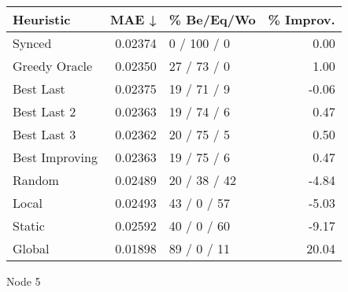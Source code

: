 \begin{tabular}{lrlr}
\toprule
\textbf{Heuristic} & \textbf{MAE ↓} & \textbf{\% Be/Eq/Wo} & \textbf{\% Improv.} \\
\midrule
            Synced &        0.02374 &          0 / 100 / 0 &                0.00 \\
     Greedy Oracle &        0.02350 &          27 / 73 / 0 &                1.00 \\
         Best Last &        0.02375 &          19 / 71 / 9 &               -0.06 \\
       Best Last 2 &        0.02363 &          19 / 74 / 6 &                0.47 \\
       Best Last 3 &        0.02362 &          20 / 75 / 5 &                0.50 \\
    Best Improving &        0.02363 &          19 / 75 / 6 &                0.47 \\
            Random &        0.02489 &         20 / 38 / 42 &               -4.84 \\
             Local &        0.02493 &          43 / 0 / 57 &               -5.03 \\
            Static &        0.02592 &          40 / 0 / 60 &               -9.17 \\
            Global &        0.01898 &          89 / 0 / 11 &               20.04 \\
\bottomrule
\end{tabular}
\caption{Node 5}
\label{tab:iid_lr05_le1_bs4_5}
